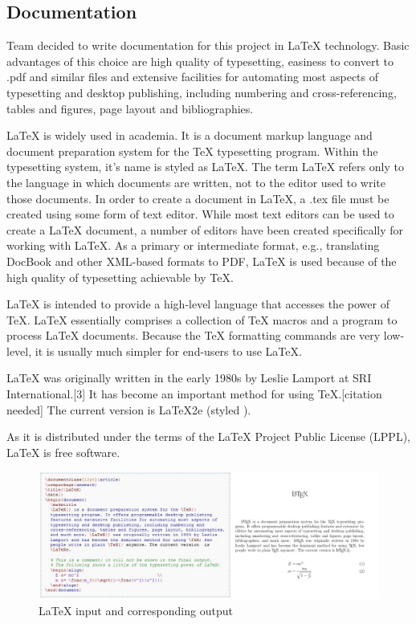 \subsection{Documentation}

Team decided to write documentation for this project in LaTeX technology. Basic advantages of this choice are high quality of typesetting, easiness to convert to .pdf and similar files and extensive facilities for automating most aspects of typesetting and desktop publishing, including numbering and cross-referencing, tables and figures, page layout and bibliographies.\newline

LaTeX is widely used in academia. It is a document markup language and document preparation system for the TeX typesetting program. Within the typesetting system, it's name is styled as \LaTeX. The term LaTeX refers only to the language in which documents are written, not to the editor used to write those documents. In order to create a document in LaTeX, a .tex file must be created using some form of text editor. While most text editors can be used to create a LaTeX document, a number of editors have been created specifically for working with LaTeX. As a primary or intermediate format, e.g., translating DocBook and other XML-based formats to PDF, LaTeX is used because of the high quality of typesetting achievable by TeX.\newline

LaTeX is intended to provide a high-level language that accesses the power of TeX. LaTeX essentially comprises a collection of TeX macros and a program to process LaTeX documents. Because the TeX formatting commands are very low-level, it is usually much simpler for end-users to use LaTeX.\newline

LaTeX was originally written in the early 1980s by Leslie Lamport at SRI International.[3] It has become an important method for using TeX.[citation needed] The current version is LaTeX2e (styled \LaTeXe).\newline

As it is distributed under the terms of the LaTeX Project Public License (LPPL), LaTeX is free software.

\begin{figure}[htb]
	\centering
	\includegraphics[width=1\textwidth]{prestudy/latex.JPG}
	\caption{LaTeX input and corresponding output}
	\label{fig:latex}
\end{figure}

